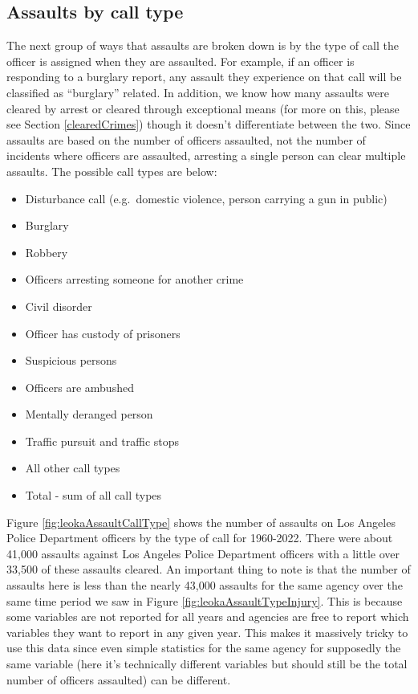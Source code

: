 \documentclass[
  12pt,
  openany]{book}
\providecommand{\tightlist}{%
  \setlength{\itemsep}{0pt}\setlength{\parskip}{0pt}}
\begin{document}
\subsection{Assaults by call type}\label{assaults-by-call-type}

The next group of ways that assaults are broken down is by the type of call the officer is assigned when they are assaulted. For example, if an officer is responding to a burglary report, any assault they experience on that call will be classified as ``burglary'' related. In addition, we know how many assaults were cleared by arrest or cleared through exceptional means (for more on this, please see Section \ref{clearedCrimes}) though it doesn't differentiate between the two. Since assaults are based on the number of officers assaulted, not the number of incidents where officers are assaulted, arresting a single person can clear multiple assaults. The possible call types are below:

\begin{itemize}
\tightlist
\item
  Disturbance call (e.g.~domestic violence, person carrying a gun in public)
\item
  Burglary
\item
  Robbery
\item
  Officers arresting someone for another crime
\item
  Civil disorder
\item
  Officer has custody of prisoners
\item
  Suspicious persons
\item
  Officers are ambushed
\item
  Mentally deranged person
\item
  Traffic pursuit and traffic stops
\item
  All other call types
\item
  Total - sum of all call types
\end{itemize}

Figure \ref{fig:leokaAssaultCallType} shows the number of assaults on Los Angeles Police Department officers by the type of call for 1960-2022. There were about 41,000 assaults against Los Angeles Police Department officers with a little over 33,500 of these assaults cleared. An important thing to note is that the number of assaults here is less than the nearly 43,000 assaults for the same agency over the same time period we saw in Figure \ref{fig:leokaAssaultTypeInjury}. This is because some variables are not reported for all years and agencies are free to report which variables they want to report in any given year. This makes it massively tricky to use this data since even simple statistics for the same agency for supposedly the same variable (here it's technically different variables but should still be the total number of officers assaulted) can be different.
\end{document}
